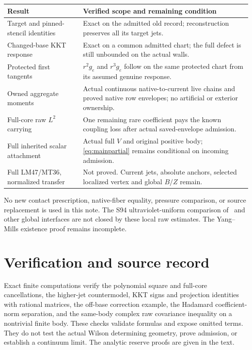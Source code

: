 \documentclass[11pt,letterpaper]{article}
\numberwithin{equation}{section}
\theoremstyle{plain}
\theoremstyle{remark}\newtheorem{remark}[theorem]{Scope}
\begin{document}
\begin{tabularx}{\textwidth}{@{}p{}X@{}}
\toprule
Result & Verified scope and remaining condition\\
\midrule
Target and pinned-stencil identities & Exact on the admitted old record;
reconstruction preserves all its target jets.\\
Changed-base KKT response & Exact on a common admitted chart;
the full defect is still unbounded on the actual walls.\\
Protected first tangents & $r^2g_e$ and $r^3g_e$ follow on the same protected
chart from its assumed genuine response.\\
Owned aggregate moments & Actual continuous native-to-current live chains
and proved native row envelopes; no artificial or exterior ownership.\\
Full-core raw $L^2$ carrying & One remaining rare coefficient pays the
known coupling loss after actual saved-envelope admission.\\
Full inherited scalar attachment & Actual full $V$ and original positive
body; \eqref{eq:mainpartial} remains conditional on incoming admission.\\
Full LM47/MT36, normalized transfer & Not proved. Current jets, absolute
anchors, selected localized vertex and global $B/Z$ remain.\\
\bottomrule
\end{tabularx}

No new contact prescription, native-fiber equality, pressure comparison,
or source replacement is used in this note. The S94
ultraviolet-uniform comparison of~\cite[pp.~692, 618--621]{W} and other global interfaces are not closed
by these local raw estimates. The Yang--Mills existence proof remains
incomplete.

\section*{Verification and source record}

Exact finite computations verify the polynomial square and
full-core cancellations, the higher-jet countermodel, KKT signs and
projection identities with rational matrices, the off-base correction
example, the Hadamard coefficient-norm separation, and the same-body
complex raw covariance inequality on a nontrivial finite body. These
checks validate formulas and expose omitted terms. They do not test the
actual Wilson determining geometry, prove admission, or establish a
continuum limit. The analytic reserve proofs are given in the text.
\end{document}
